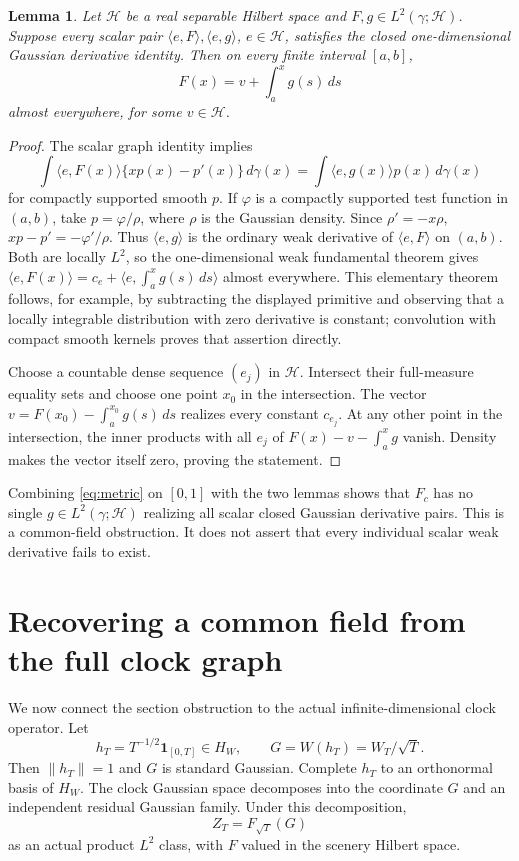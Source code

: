 \documentclass[11pt]{article}
\newtheorem{lemma}[theorem]{Lemma}
\newcommand{\Hh}{\mathcal H}\newcommand{\code}[1]{{\small\nolinkurl{#1}}}
\begin{document}
\begin{lemma}\label{lem:weakvector}
Let $\Hh$ be a real separable Hilbert space and
$F,g\in L^2(\gamma;\Hh)$. Suppose every scalar pair
$\langle e,F\rangle,\langle e,g\rangle$, $e\in\Hh$,
satisfies the closed one-dimensional Gaussian derivative
identity. Then on every finite interval $[a,b]$,
\[
 F(x)=v+\int_a^xg(s)\,ds
\]
almost everywhere, for some $v\in\Hh$.
\end{lemma}
\begin{proof}
The scalar graph identity implies
\[
 \int\langle e,F(x)\rangle\{xp(x)-p'(x)\}\,d\gamma(x)
       =\int\langle e,g(x)\rangle p(x)\,d\gamma(x)
\]
for compactly supported smooth $p$. If $\varphi$ is a
compactly supported test function in $(a,b)$, take
$p=\varphi/\rho$, where $\rho$ is the Gaussian density.
Since $\rho'=-x\rho$, $xp-p'=-\varphi'/\rho$.
Thus $\langle e,g\rangle$ is the ordinary weak derivative
of $\langle e,F\rangle$ on $(a,b)$.
Both are locally $L^2$, so the one-dimensional weak
fundamental theorem gives
$\langle e,F(x)\rangle=c_e+
\langle e,\int_a^xg(s)\,ds\rangle$ almost everywhere.
This elementary theorem follows, for example, by
subtracting the displayed primitive and observing that
a locally integrable distribution with zero derivative
is constant; convolution with compact smooth kernels
proves that assertion directly.

Choose a countable dense sequence $(e_j)$ in $\Hh$.
Intersect their full-measure equality sets and choose
one point $x_0$ in the intersection. The vector
$v=F(x_0)-\int_a^{x_0}g(s)\,ds$ realizes every constant
$c_{e_j}$. At any other point in the intersection,
the inner products with all $e_j$ of
$F(x)-v-\int_a^xg$ vanish. Density makes the vector
itself zero, proving the statement.
\end{proof}

Combining \eqref{eq:metric} on $[0,1]$ with the two
lemmas shows that $F_c$ has no single
$g\in L^2(\gamma;\Hh)$ realizing all scalar closed
Gaussian derivative pairs. This is a common-field
obstruction. It does not assert that every individual
scalar weak derivative fails to exist.

\section{Recovering a common field from the full clock graph}
We now connect the section obstruction to the actual
infinite-dimensional clock operator. Let
\[
 h_T=T^{-1/2}\mathbf1_{[0,T]}\in H_W,\qquad
 G=W(h_T)=W_T/\sqrt T.
\]
Then $\|h_T\|=1$ and $G$ is standard Gaussian.
Complete $h_T$ to an orthonormal basis of $H_W$.
The clock Gaussian space decomposes into the coordinate
$G$ and an independent residual Gaussian family.
Under this decomposition,
\begin{equation}\label{eq:pullback}
 Z_T=F_{\sqrt T}(G)
\end{equation}
as an actual product $L^2$ class, with $F$ valued in
the scenery Hilbert space.
\end{document}
